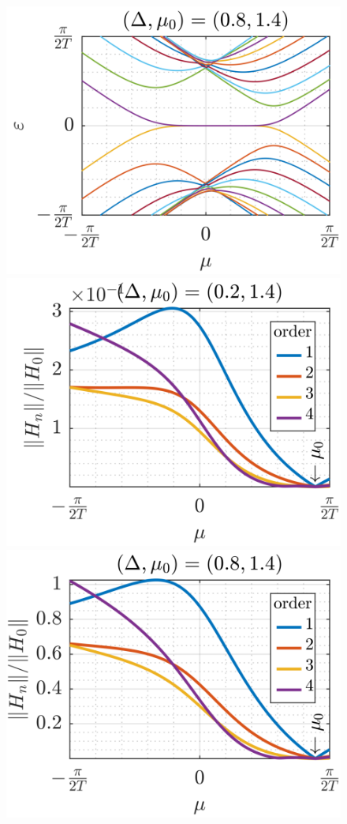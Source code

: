 \documentclass[11pt]{report}
\begin{document}
\begin{figure}
\includegraphics[scale=1]{Figures/New/Quasienergies_Expansion4.png}\\
\includegraphics[scale=1]{Figures/New/Expansion_Amplitude3.png}%
\includegraphics[scale=1]{Figures/New/Expansion_Amplitude4.png}\\

\end{figure}
\end{document}
